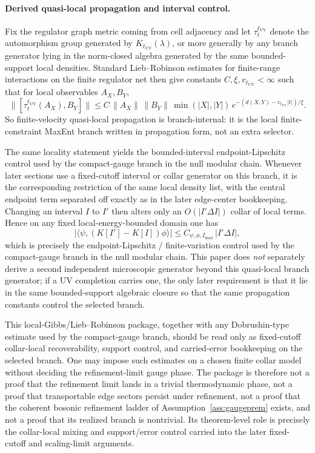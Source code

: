 \documentclass[11pt]{article}
\begin{document}
\paragraph{Derived quasi-local propagation and interval control.}
Fix the regulator graph metric coming from cell adjacency and let \(\tau_t^{\ell_{\mathrm{UV}}}\) denote the automorphism group generated by \(K_{\ell_{\mathrm{UV}}}(\lambda)\), or more generally by any branch generator lying in the norm-closed algebra generated by the same bounded-support local densities. Standard Lieb--Robinson estimates for finite-range interactions on the finite regulator net then give constants \(C,\xi,v_{\ell_{\mathrm{UV}}}<\infty\) such that for local observables \(A_X,B_Y\), \cite{liebRobinson72}
\[
\bigl\|[\tau_t^{\ell_{\mathrm{UV}}}(A_X),B_Y]\bigr\|
\le
C\,\|A_X\|\,\|B_Y\|\,\min(|X|,|Y|)\,
e^{-(d(X,Y)-v_{\ell_{\mathrm{UV}}}|t|)/\xi}.
\]
So finite-velocity quasi-local propagation is branch-internal: it is the local finite-constraint MaxEnt branch written in propagation form, not an extra selector.

The same locality statement yields the bounded-interval endpoint-Lipschitz control used by the compact-gauge branch in the null modular chain. Whenever later sections use a fixed-cutoff interval or collar generator on this branch, it is the corresponding restriction of the same local density list, with the central endpoint term separated off exactly as in the later edge-center bookkeeping. Changing an interval \(I\) to \(I'\) then alters only an \(O(|I'\Delta I|)\) collar of local terms. Hence on any fixed local-energy-bounded domain one has
\[
\left|\langle\psi,(K[I']-K[I])\phi\rangle\right|
\le
C_{\psi,\phi,I_{\max}}\,|I'\Delta I|,
\]
which is precisely the endpoint-Lipschitz / finite-variation control used by the compact-gauge branch in the null modular chain. This paper does \emph{not} separately derive a second independent microscopic generator beyond this quasi-local branch generator; if a UV completion carries one, the only later requirement is that it lie in the same bounded-support algebraic closure so that the same propagation constants control the selected branch.

This local-Gibbs/Lieb--Robinson package, together with any Dobrushin-type estimate used by the compact-gauge branch, should be read only as fixed-cutoff collar-local recoverability, support control, and carried-error bookkeeping on the selected branch. One may impose such estimates on a chosen finite collar model without deciding the refinement-limit gauge phase. The package is therefore not a proof that the refinement limit lands in a trivial thermodynamic phase, not a proof that transportable edge sectors persist under refinement, not a proof that the coherent bosonic refinement ladder of Assumption~\ref{ass:gaugeprem} exists, and not a proof that its realized branch is nontrivial. Its theorem-level role is precisely the collar-local mixing and support/error control carried into the later fixed-cutoff and scaling-limit arguments.
\end{document}
